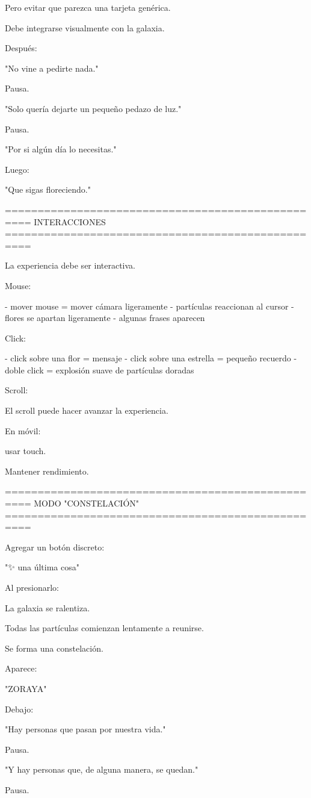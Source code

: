 Pero evitar que parezca una tarjeta genérica.

Debe integrarse visualmente con la galaxia.

Después:

"No vine a pedirte nada."

Pausa.

"Solo quería dejarte un pequeño pedazo de luz."

Pausa.

"Por si algún día lo necesitas."

Luego:

"Que sigas floreciendo."

==================================================
INTERACCIONES
==================================================

La experiencia debe ser interactiva.

Mouse:

- mover mouse = mover cámara ligeramente
- partículas reaccionan al cursor
- flores se apartan ligeramente
- algunas frases aparecen

Click:

- click sobre una flor = mensaje
- click sobre una estrella = pequeño recuerdo
- doble click = explosión suave de partículas doradas

Scroll:

El scroll puede hacer avanzar la experiencia.

En móvil:

usar touch.

Mantener rendimiento.

==================================================
MODO "CONSTELACIÓN"
==================================================

Agregar un botón discreto:

"✨ una última cosa"

Al presionarlo:

La galaxia se ralentiza.

Todas las partículas comienzan lentamente a reunirse.

Se forma una constelación.

Aparece:

"ZORAYA"

Debajo:

"Hay personas que pasan por nuestra vida."

Pausa.

"Y hay personas que, de alguna manera, se quedan."

Pausa.

